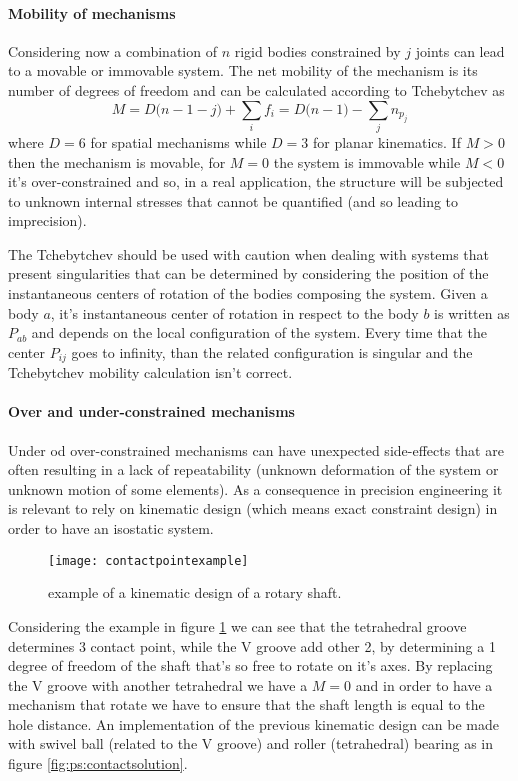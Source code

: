 	\paragraph{Mobility of mechanisms} Considering now  a combination of $n$ rigid bodies constrained by $j$ joints can lead to a movable or immovable system. The net mobility of the mechanism is its number of degrees of freedom and can be calculated according to Tchebytchev as
	\begin{equation}
		M = D\big(n-1-j\big) +\sum_i f_i = D\big(n-1\big) -\sum_j n_{p_j}
	\end{equation}
	where $D= 6$ for spatial mechanisms while $D= 3$ for planar kinematics. If $M>0$ then the mechanism is movable, for $M = 0$ the system is immovable while $M < 0$ it's over-constrained and so, in a real application, the structure will be subjected to unknown internal stresses that cannot be quantified (and so leading to imprecision).
	
	The Tchebytchev should be used with caution when dealing with systems that present singularities that can be determined by considering the position of the instantaneous centers of rotation of the bodies composing the system. Given a body $a$, it's instantaneous center of rotation in respect to the body $b$ is written as $P_{ab}$ and depends on the local configuration of the system. Every time that the center $P_{ij}$ goes to infinity, than the related configuration is singular and the Tchebytchev mobility calculation isn't correct.
	
	\paragraph{Over and under-constrained mechanisms} Under od over-constrained mechanisms can have unexpected side-effects that are often resulting in a lack of repeatability (unknown deformation of the system or unknown motion of some elements). As a consequence in precision engineering it is relevant to rely on kinematic design (which means exact constraint design) in order to have an isostatic system.
	
	\begin{figure}[bht]
		\centering
		\texttt{[image: contactpointexample]}
		\caption{example of a kinematic design of a rotary shaft.}
		\label{fig:ps:contactpointexample}
	\end{figure}

	Considering the example in figure \ref{fig:ps:contactpointexample} we can see that the tetrahedral groove determines 3 contact point, while the V groove add other 2, by determining a 1 degree of freedom of the shaft that's so free to rotate on it's axes. By replacing the V groove with another tetrahedral we have a $M=0$ and in order to have a mechanism that rotate we have to ensure that the shaft length is equal to the hole distance. An implementation of the previous kinematic design can be made with swivel ball (related to the V groove) and roller (tetrahedral) bearing as in figure \ref{fig:ps:contactsolution}.
	

